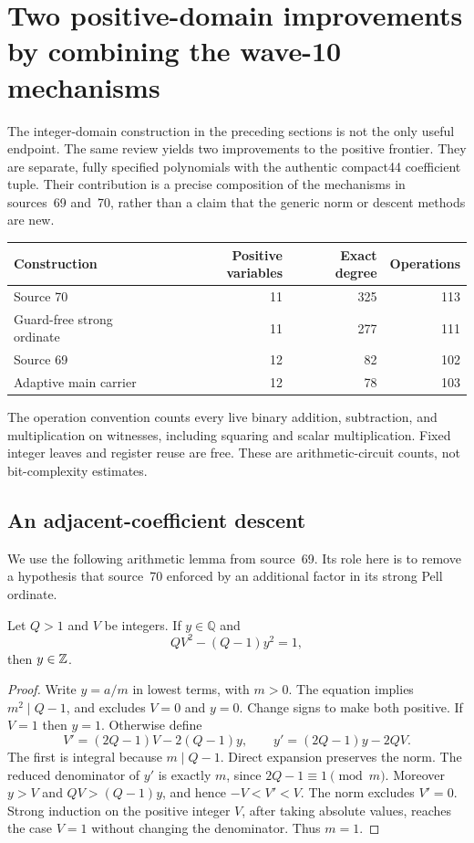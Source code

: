 \section{Two positive-domain improvements by combining the wave-10 mechanisms}
\label{sec:positive-improvements}

The integer-domain construction in the preceding sections is not the only
useful endpoint.  The same review yields two improvements to the positive
frontier.  They are separate, fully specified polynomials with the authentic
compact44 coefficient tuple.  Their contribution is a precise composition
of the mechanisms in sources~69 and~70, rather than a claim that the generic
norm or descent methods are new.

\begin{center}
\begin{tabular}{lrrr}
\hline
Construction & Positive variables & Exact degree & Operations\\
\hline
Source 70 & 11 & 325 & 113\\
Guard-free strong ordinate & 11 & 277 & 111\\
Source 69 & 12 & 82 & 102\\
Adaptive main carrier & 12 & 78 & 103\\
\hline
\end{tabular}
\end{center}

The operation convention counts every live binary addition, subtraction,
and multiplication on witnesses, including squaring and scalar
multiplication. Fixed integer leaves and register reuse are free. These are
arithmetic-circuit counts, not bit-complexity estimates.

\subsection{An adjacent-coefficient descent}

We use the following arithmetic lemma from source~69\cite{source69}.
Its role here is to remove a hypothesis that source~70 enforced by an
additional factor in its strong Pell ordinate.

\begin{lemma}
\label{lem:adjacent-descent}
Let $Q>1$ and $V$ be integers. If $y\in\mathbb Q$ and
\[
 QV^2-(Q-1)y^2=1,
\]
then $y\in\mathbb Z$.
\end{lemma}
\begin{proof}
Write $y=a/m$ in lowest terms, with $m>0$. The equation implies
$m^2\mid Q-1$, and excludes $V=0$ and $y=0$. Change signs to make both
positive. If $V=1$ then $y=1$. Otherwise define
\[
 V'=(2Q-1)V-2(Q-1)y,\qquad
 y'=(2Q-1)y-2QV.
\]
The first is integral because $m\mid Q-1$. Direct expansion preserves the
norm. The reduced denominator of $y'$ is exactly $m$, since
$2Q-1\equiv1\pmod m$. Moreover $y>V$ and $QV>(Q-1)y$, and hence
$-V<V'<V$. The norm excludes $V'=0$. Strong induction on the positive
integer $V$, after taking absolute values, reaches the case $V=1$
without changing the denominator. Thus $m=1$.
\end{proof}

